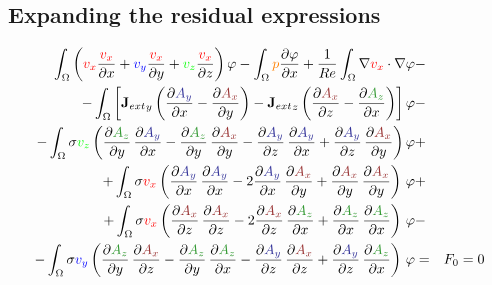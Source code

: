 \documentclass[smallextended]{svjour3}       %
\begin{document}
		\subsection{Expanding the residual expressions}
		\begin{eqnarray}
			\int_{\Omega} \left(\textcolor{red}{v_x} \frac{\textcolor{red}{v_x}}{\partial x} + \textcolor{blu}{v_y} \frac{\textcolor{red}{v_x}}{\partial y} + \textcolor{gre}{v_z} \frac{\textcolor{red}{v_x}}{\partial z}\right) \varphi
			- \int_{\Omega} \textcolor{orange}{p} \frac{\partial \varphi}{\partial x}
			+ \frac{1}{Re} \int_{\Omega} \nabla \textcolor{red}{v_x} \cdot \nabla \varphi
			\nonumber & -\\
			- \int_{\Omega} \left[{\mathbf{J}_{ext}}_y \left(\frac{\partial \textcolor{darkblu}{A_y}}{\partial x} - \frac{\partial \textcolor{darkred}{A_x}}{\partial y}\right) - {\mathbf{J}_{ext}}_z \left(\frac{\partial \textcolor{darkred}{A_x}}{\partial z} - \frac{\partial \textcolor{darkgre}{A_z}}{\partial x}\right)\right] \varphi			
			\nonumber & -\\
			- \int_{\Omega} \sigma \textcolor{gre}{v_z} \left(\frac{\partial \textcolor{darkgre}{A_z}}{\partial y}\,\frac{\partial \textcolor{darkblu}{A_y}}{\partial x} - \frac{\partial \textcolor{darkgre}{A_z}}{\partial y}\,\frac{\partial \textcolor{darkred}{A_x}}{\partial y} - \frac{\partial \textcolor{darkblu}{A_y}}{\partial z}\,\frac{\partial \textcolor{darkblu}{A_y}}{\partial x} + \frac{\partial \textcolor{darkblu}{A_y}}{\partial z}\,\frac{\partial \textcolor{darkred}{A_x}}{\partial y} \right) \varphi& +\nonumber \\			
			+ \int_{\Omega} \sigma \textcolor{red}{v_x} \left(\frac{\partial \textcolor{darkblu}{A_y}}{\partial x}\,\frac{\partial \textcolor{darkblu}{A_y}}{\partial x} - 2 \frac{\partial \textcolor{darkblu}{A_y}}{\partial x}\,\frac{\partial \textcolor{darkred}{A_x}}{\partial y} + \frac{\partial \textcolor{darkred}{A_x}}{\partial y}\,\frac{\partial \textcolor{darkred}{A_x}}{\partial y} \right)\, \varphi& +\nonumber \\			
			+ \int_{\Omega} \sigma \textcolor{red}{v_x} \left(\frac{\partial \textcolor{darkred}{A_x}}{\partial z}\,\frac{\partial \textcolor{darkred}{A_x}}{\partial z} - 2 \frac{\partial \textcolor{darkred}{A_x}}{\partial z}\,\frac{\partial \textcolor{darkgre}{A_z}}{\partial x} + \frac{\partial \textcolor{darkgre}{A_z}}{\partial x}\,\frac{\partial \textcolor{darkgre}{A_z}}{\partial x} \right)\, \varphi& -\nonumber \\			
			- \int_{\Omega} \sigma \textcolor{blu}{v_y} \left(\frac{\partial \textcolor{darkgre}{A_z}}{\partial y}\,\frac{\partial \textcolor{darkred}{A_x}}{\partial z} - \frac{\partial \textcolor{darkgre}{A_z}}{\partial y}\,\frac{\partial \textcolor{darkgre}{A_z}}{\partial x} - \frac{\partial \textcolor{darkblu}{A_y}}{\partial z}\,\frac{\partial \textcolor{darkred}{A_x}}{\partial z}  + \frac{\partial \textcolor{darkblu}{A_y}}{\partial z}\,\frac{\partial \textcolor{darkgre}{A_z}}{\partial x} \right)\, \varphi& = & F_0 = 0 \\			

\end{eqnarray}
\end{document}
